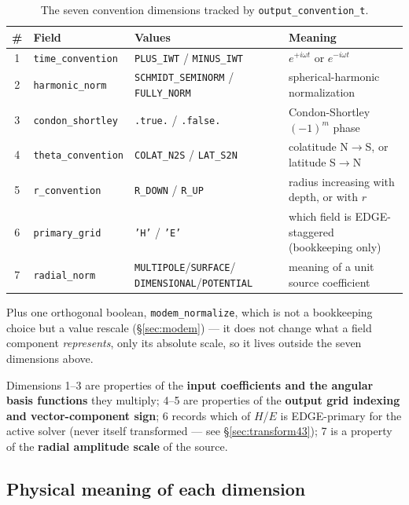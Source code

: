 \documentclass[11pt]{article}
\begin{document}
\begin{table}[h]
\centering
\small
\begin{tabular}{@{}cp{2.9cm}p{3.6cm}p{4.6cm}@{}}
\toprule
\# & Field & Values & Meaning \\
\midrule
1 & \texttt{time\_convention}    & \texttt{PLUS\_IWT} / \texttt{MINUS\_IWT} & $e^{+i\omega t}$ or $e^{-i\omega t}$ \\
2 & \texttt{harmonic\_norm}      & \texttt{SCHMIDT\_SEMINORM} / \texttt{FULLY\_NORM} & spherical-harmonic normalization \\
3 & \texttt{condon\_shortley}    & \texttt{.true.} / \texttt{.false.} & Condon-Shortley $(-1)^m$ phase \\
4 & \texttt{theta\_convention}   & \texttt{COLAT\_N2S} / \texttt{LAT\_S2N} & colatitude N$\to$S, or latitude S$\to$N \\
5 & \texttt{r\_convention}       & \texttt{R\_DOWN} / \texttt{R\_UP} & radius increasing with depth, or with $r$ \\
6 & \texttt{primary\_grid}       & \texttt{'H'} / \texttt{'E'} & which field is EDGE-staggered (bookkeeping only) \\
7 & \texttt{radial\_norm}        & \texttt{MULTIPOLE}/\texttt{SURFACE}/ \texttt{DIMENSIONAL}/\texttt{POTENTIAL} & meaning of a unit source coefficient \\
\bottomrule
\end{tabular}
\caption{The seven convention dimensions tracked by \texttt{output\_convention\_t}.}
\end{table}

Plus one orthogonal boolean, \texttt{modem\_normalize}, which is not a bookkeeping choice but a
value rescale (\S\ref{sec:modem}) --- it does not change what a field component \emph{represents},
only its absolute scale, so it lives outside the seven dimensions above.

Dimensions 1--3 are properties of the \textbf{input coefficients and the angular basis functions}
they multiply; 4--5 are properties of the \textbf{output grid indexing and vector-component sign};
6 records which of $H$/$E$ is EDGE-primary for the active solver (never itself transformed --- see
\S\ref{sec:transform43}); 7 is a property of the \textbf{radial amplitude scale} of the source.

\subsection*{Physical meaning of each dimension}
\end{document}
